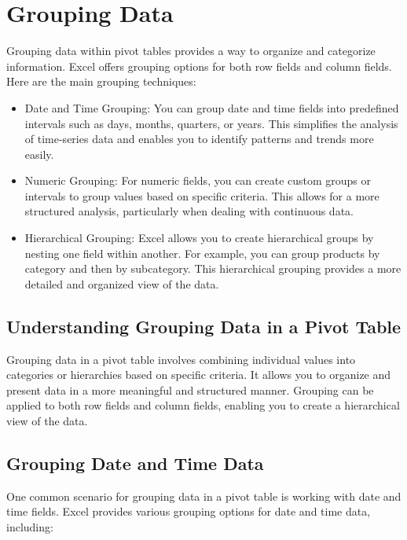 \documentclass[
]{book}
\begin{document}
\hypertarget{grouping-data}{%
\section{Grouping Data}\label{grouping-data}}

Grouping data within pivot tables provides a way to organize and categorize information. Excel offers grouping options for both row fields and column fields. Here are the main grouping techniques:

\begin{itemize}
\item
  Date and Time Grouping: You can group date and time fields into predefined intervals such as days, months, quarters, or years. This simplifies the analysis of time-series data and enables you to identify patterns and trends more easily.
\item
  Numeric Grouping: For numeric fields, you can create custom groups or intervals to group values based on specific criteria. This allows for a more structured analysis, particularly when dealing with continuous data.
\item
  Hierarchical Grouping: Excel allows you to create hierarchical groups by nesting one field within another. For example, you can group products by category and then by subcategory. This hierarchical grouping provides a more detailed and organized view of the data.
\end{itemize}

\hypertarget{understanding-grouping-data-in-a-pivot-table}{%
\subsection{Understanding Grouping Data in a Pivot Table}\label{understanding-grouping-data-in-a-pivot-table}}

Grouping data in a pivot table involves combining individual values into categories or hierarchies based on specific criteria. It allows you to organize and present data in a more meaningful and structured manner. Grouping can be applied to both row fields and column fields, enabling you to create a hierarchical view of the data.

\hypertarget{grouping-date-and-time-data}{%
\subsection{Grouping Date and Time Data}\label{grouping-date-and-time-data}}

One common scenario for grouping data in a pivot table is working with date and time fields. Excel provides various grouping options for date and time data, including:
\end{document}
